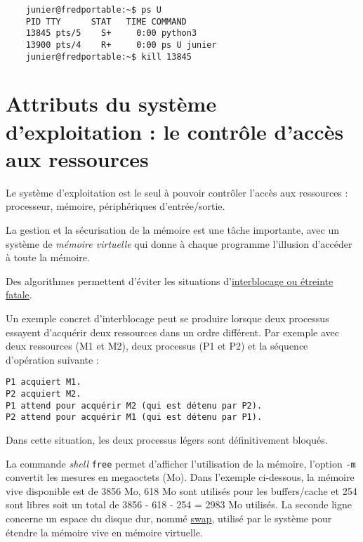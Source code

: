 \documentclass[
  11pt,
]{article}
\newcounter{thme}
\newcounter{alg}
\newcounter{prog}
\begin{document}
\begin{verbatim}
    junier@fredportable:~$ ps U
    PID TTY      STAT   TIME COMMAND
    13845 pts/5    S+     0:00 python3
    13900 pts/4    R+     0:00 ps U junier
    junier@fredportable:~$ kill 13845
\end{verbatim}

\hypertarget{attributs-du-systuxe8me-dexploitation-le-contruxf4le-daccuxe8s-aux-ressources}{%
\section{Attributs du système d'exploitation : le contrôle d'accès aux
ressources}\label{attributs-du-systuxe8me-dexploitation-le-contruxf4le-daccuxe8s-aux-ressources}}

Le système d'exploitation est le seul à pouvoir contrôler l'accès aux
ressources : processeur, mémoire, périphériques d'entrée/sortie.

La gestion et la sécurisation de la mémoire est une tâche importante,
avec un système de \emph{mémoire virtuelle} qui donne à chaque programme
l'illusion d'accéder à toute la mémoire.

Des algorithmes permettent d'éviter les situations
d'\href{https://fr.wikipedia.org/wiki/Interblocage}{interblocage ou
étreinte fatale}.

Un exemple concret d'interblocage peut se produire lorsque deux
processus essayent d'acquérir deux ressources dans un ordre différent.
Par exemple avec deux ressources (M1 et M2), deux processus (P1 et P2)
et la séquence d'opération suivante :

\begin{verbatim}
P1 acquiert M1.
P2 acquiert M2.
P1 attend pour acquérir M2 (qui est détenu par P2).
P2 attend pour acquérir M1 (qui est détenu par P1).
\end{verbatim}

Dans cette situation, les deux processus légers sont définitivement
bloqués.

La commande \emph{shell} \texttt{free} permet d'afficher l'utilisation
de la mémoire, l'option \texttt{-m} convertit les mesures en megaoctets
(Mo). Dans l'exemple ci-dessous, la mémoire vive disponible est de 3856
Mo, 618 Mo sont utilisés pour les buffers/cache et 254 sont libres soit
un total de 3856 - 618 - 254 = 2983 Mo utilisés. La seconde ligne
concerne un espace du disque dur, nommé
\href{https://doc.ubuntu-fr.org/swap}{swap}, utilisé par le système pour
étendre la mémoire vive en mémoire virtuelle.
\end{document}
